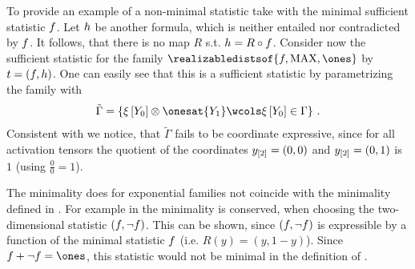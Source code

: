 \documentclass[aps,onecolumn,nofootinbib,pra]{article}
\begin{document}
    \begin{example}
        To provide an example of a non-minimal statistic take  with the minimal sufficient statistic $f$.
        Let $h$ be another formula, which is neither entailed nor contradicted by $f$.
        It follows, that there is no map $R$ s.t. $h=R\circ f$.
        Consider now the sufficient statistic for the family $\realizabledistsof{\exformula,\maxgraph,\trivbm}$ by $t=(f,h)$.
        One can easily see that this is a sufficient statistic by parametrizing the family with
        \begin{align*}
            \tilde{\Gamma} = \left\{ \acttensorat{\headvariableof{0}} \otimes \onesat{\headvariableof{1}}
                         \wcols \acttensorat{\headvariableof{0}} \in \Gamma \right\} \, .
        \end{align*}
        Consistent with  we notice, that $\tilde{\Gamma}$ fails to be coordinate expressive, since for all activation tensors the quotient of the coordinates $y_{[2]}=(0,0)$ and $y_{[2]}=(0,1)$ is $1$ (using $\frac{0}{0}=1$). %
    \end{example}


    \begin{remark}
        The minimality does for exponential families not coincide with the minimality defined in \cite{wainwright_graphical_2008}.
        For example in  the minimality is conserved, when choosing the two-dimensional statistic $(f,\lnot f)$.
        This can be shown, since $(f,\lnot f)$ is expressible by a function of the minimal statistic $f$ (i.e. $R(y)=(y,1-y)$).
        Since $\exformula+\lnot\exformula=\ones$, this statistic would not be minimal in the definition of \cite{wainwright_graphical_2008}.
    \end{remark}
\end{document}
